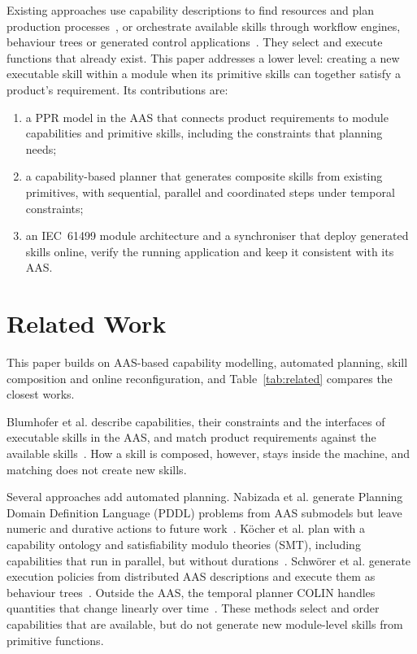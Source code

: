 \documentclass[5p,times,procedia]{elsarticle}
\begin{document}
Existing approaches use capability descriptions to find resources and plan production processes~\cite{nabizada2026capability,koecher2024smt}, or orchestrate available skills through workflow engines, behaviour trees or generated control applications~\cite{lindorfer2019user,jensen2026service,schwoerer2026fond,dorofeev2021orchestrator}. They select and execute functions that already exist. This paper addresses a lower level: creating a new executable skill within a module when its primitive skills can together satisfy a product's requirement. Its contributions are:
\begin{enumerate}
\item a PPR model in the AAS that connects product requirements to module capabilities and primitive skills, including the constraints that planning needs;
\item a capability-based planner that generates composite skills from existing primitives, with sequential, parallel and coordinated steps under temporal constraints;
\item an IEC~61499 module architecture and a synchroniser that deploy generated skills online, verify the running application and keep it consistent with its AAS.
\end{enumerate}

\section{Related Work}
\label{sec:related}

This paper builds on AAS-based capability modelling, automated planning, skill composition and online reconfiguration, and Table~\ref{tab:related} compares the closest works.

Blumhofer et al. describe capabilities, their constraints and the interfaces of executable skills in the AAS, and match product requirements against the available skills~\cite{blumhofer2025enhancing}. How a skill is composed, however, stays inside the machine, and matching does not create new skills.

Several approaches add automated planning. Nabizada et al. generate Planning Domain Definition Language (PDDL) problems from AAS submodels but leave numeric and durative actions to future work~\cite{nabizada2026capability}. Köcher et al. plan with a capability ontology and satisfiability modulo theories (SMT), including capabilities that run in parallel, but without durations~\cite{koecher2024smt}. Schwörer et al. generate execution policies from distributed AAS descriptions and execute them as behaviour trees~\cite{schwoerer2026fond}. Outside the AAS, the temporal planner COLIN handles quantities that change linearly over time~\cite{coles2012colin}. These methods select and order capabilities that are available, but do not generate new module-level skills from primitive functions.
\end{document}
